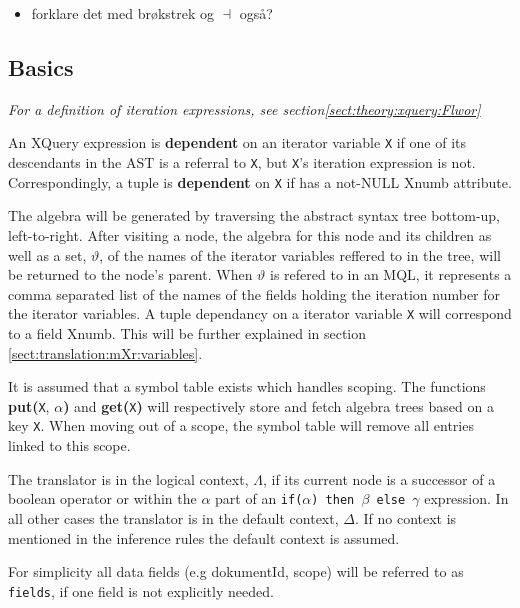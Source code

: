 \begin{itemize}
  \item forklare det med br\o kstrek og $\dashv$ ogs\aa ?
\end{itemize}


\subsection{Basics}
\label{sect:translation:mXr:basics}


\textit{For a definition of iteration expressions, see
section\ref{sect:theory:xquery:Flwor}} 

\begin{myDefinition}
An XQuery expression is \textbf{dependent} on an iterator variable \texttt{X} if one of its descendants in the AST
is a referral to \texttt{X}, but \texttt{X}'s iteration expression is not. Correspondingly, a tuple is
\textbf{dependent} on \texttt{X} if has a not-\textsf{NULL} \textsf{Xnumb} attribute.
\end{myDefinition}

The algebra will be generated by traversing the abstract syntax tree bottom-up, left-to-right. After visiting a
node, the algebra for this node and its children as well as a set, $\vartheta$, of the names of the iterator
variables reffered to in the tree, will be returned to the node's parent. When $\vartheta$ is refered to in an MQL,
it represents a comma separated list of the names of the fields holding the iteration number for the iterator
variables. A tuple dependancy on a iterator variable \texttt{X} will correspond to a field \textsf{Xnumb}. This
will be further explained in section \ref{sect:translation:mXr:variables}.

It is assumed that a symbol table exists which handles scoping. The functions
\textbf{put(}\texttt{X}, $\alpha$\textbf{)} and \textbf{get(}\texttt{X}\textbf{)}
will respectively store and fetch algebra trees based on a key \verb!X!. When
moving out of a scope, the symbol table will remove all entries linked to this scope.

The translator is in the logical context, $\Lambda$, if its current node is a
successor of a boolean operator or within the $\alpha$ part of an
\texttt{if($\alpha$) then $\beta$ else $\gamma$} expression. In all other cases
the translator is in the default context, $\Delta$. If no context is mentioned
in the inference rules the default context is assumed.

For simplicity all data fields (e.g \textsf{dokumentId, scope}) will be
referred to as \verb!fields!, if one field is not explicitly needed.

